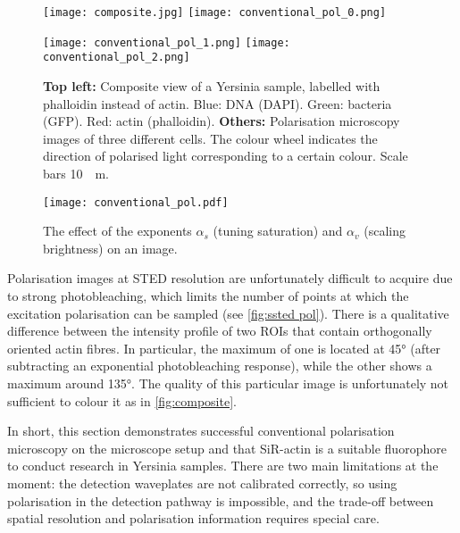 \begin{figure}
	\centering
	\newlength{\spacing}
	\setlength{\spacing}{7pt}
	
	\texttt{[image: composite.jpg]}%
	\hspace{\spacing}%
	\texttt{[image: conventional\_pol\_0.png]}
	
	\vspace{\spacing}
	
	\texttt{[image: conventional\_pol\_1.png]}%
	\hspace{\spacing}%
	\texttt{[image: conventional\_pol\_2.png]}
	
	\caption{
		\textbf{Top left:} Composite view of a Yersinia sample, labelled with phalloidin instead of actin. Blue: DNA (DAPI). Green: bacteria (GFP). Red: actin (phalloidin).
		\textbf{Others:} Polarisation microscopy images of three different cells. The colour wheel indicates the direction of polarised light corresponding to a certain colour. Scale bars \SI{10}{\mu m}.
	}
	\label{fig:composite}
\end{figure}

\begin{figure}
	\centering
	\texttt{[image: conventional\_pol.pdf]}
	\caption{
		The effect of the exponents $ \alpha_s $ (tuning saturation) and $ \alpha_v $ (scaling brightness) on an image.
	}
	\label{fig:power law exponents}
\end{figure}

Polarisation images at STED resolution are unfortunately difficult to acquire due to strong photobleaching, which limits the number of points at which the excitation polarisation can be sampled (see \autoref{fig:ssted pol}). There is a qualitative difference between the intensity profile of two ROIs that contain orthogonally oriented actin fibres. In particular, the maximum of one is located at \ang{45} (after subtracting an exponential photobleaching response), while the other shows a maximum around \ang{135}. The quality of this particular image is unfortunately not sufficient to colour it as in \autoref{fig:composite}.

In short, this section demonstrates successful conventional polarisation microscopy on the microscope setup and that SiR-actin is a suitable fluorophore to conduct research in Yersinia samples. There are two main limitations at the moment: the detection waveplates are not calibrated correctly, so using polarisation in the detection pathway is impossible, and the trade-off between spatial resolution and polarisation information requires special care.


